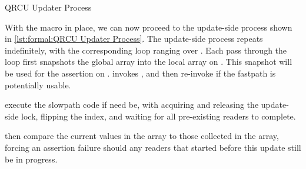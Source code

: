 \QuickQuizEnd

\begin{listing}
\caption{QRCU Updater Process}
\label{lst:formal:QRCU Updater Process}
\end{listing}

\begin{fcvref}
With the  macro in place, we can now proceed
to the update-side process shown in
\cref{lst:formal:QRCU Updater Process}.
The update-side process repeats indefinitely, with the corresponding
 loop ranging over .
Each pass through the loop first snapshots the global 
array into the local  array on
.
This snapshot will be used for the assertion on .
 invokes , and then
re-invoke  if the fastpath is potentially
usable.

 execute the slowpath code if need be, with
 acquiring and releasing the update-side lock,
 flipping the index, and
 waiting for
all pre-existing readers to complete.

 then compare the current values
in the 
array to those collected in the  array,
forcing an assertion failure should any readers that started before
this update still be in progress.
\end{fcvref}

